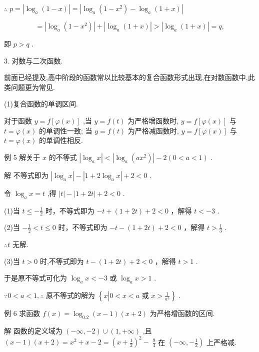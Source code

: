\documentclass[10pt]{article}
\begin{document}
\(\therefore \;p = \left| {{\log }_{a}\left( {1 - x}\right) }\right|  = \left| {{\log }_{a}\left( {1 - {x}^{2}}\right)  - {\log }_{a}\left( {1 + x}\right) }\right|\)

\[
= \left| {{\log }_{a}\left( {1 - {x}^{2}}\right) }\right|  + \left| {{\log }_{a}\left( {1 + x}\right) }\right|  > \left| {{\log }_{a}\left( {1 + x}\right) }\right|  = q,
\]

即 \(p > q\) .

3. 对数与二次函数.

前面已经提及,高中阶段的函数常以比较基本的复合函数形式出现,在对数函数中,此类问题更为常见.

(1)复合函数的单调区间.

对于函数 \(y = f\left\lbrack  {\varphi \left( x\right) }\right\rbrack\) ,当 \(y = f\left( t\right)\) 为严格增函数时, \(y = f\left\lbrack  {\varphi \left( x\right) }\right\rbrack\) 与 \(t = \varphi \left( x\right)\) 的单调性一致; 当 \(y = f\left( t\right)\) 为严格减函数时, \(y = f\left\lbrack  {\varphi \left( x\right) }\right\rbrack\) 与 \(t = \varphi \left( x\right)\) 的单调性相反.

例 5 解关于 \(x\) 的不等式 \(\left| {{\log }_{a}x}\right|  < \left| {{\log }_{a}\left( {a{x}^{2}}\right) }\right|  - 2\left( {0 < a < 1}\right)\) .

解 不等式即为 \(\left| {{\log }_{a}x}\right|  - \left| {1 + 2{\log }_{a}x}\right|  + 2 < 0\) .

令 \({\log }_{a}x = t\) ,得 \(\left| t\right|  - \left| {1 + {2t}}\right|  + 2 < 0\) .

(1)当 \(t \leq   - \frac{1}{2}\) 时，不等式即为 \(- t + \left( {1 + {2t}}\right)  + 2 < 0\) ，解得 \(t <  - 3\) .

(2)当 \(- \frac{1}{2} < t \leq  0\) 时，不等式即为 \(- t - \left( {1 + {2t}}\right)  + 2 < 0\) ，解得 \(t > \frac{1}{3}\) .

\(\therefore t\) 无解.

(3)当 \(t > 0\) 时,不等式即为 \(t - \left( {1 + {2t}}\right)  + 2 < 0\) ，解得 \(t > 1\) .

于是原不等式可化为 \({\log }_{a}x <  - 3\) 或 \({\log }_{a}x > 1\) .

\(\because 0 < a < 1,\therefore\) 原不等式的解为 \(\left\{  {x\left| {0 < x < a\text{ 或 }x > \frac{1}{{a}^{3}}}\right. }\right\}\) .

例 6 求函数 \(f\left( x\right)  = {\log }_{0.2}\left( {x - 1}\right) \left( {x + 2}\right)\) 为严格增函数的区间.

解 函数的定义域为 \(\left( {-\infty , - 2}\right)  \cup  \left( {1, + \infty }\right)\) ,且 \(\left( {x - 1}\right) \left( {x + 2}\right)  = {x}^{2} + x - 2 = {\left( x + \frac{1}{2}\right) }^{2} - \; \frac{9}{4}\) 在 \(\left( {-\infty , - \frac{1}{2}}\right)\) 上严格减.
\end{document}
